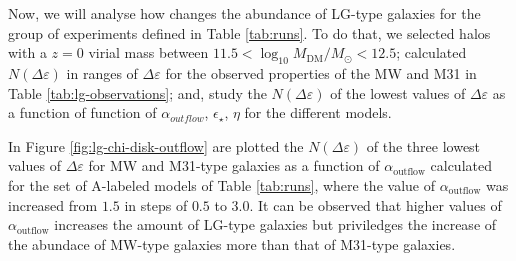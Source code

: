 \documentclass[usenatbib]{mn2e}
\begin{document}
Now, we will analyse how changes the abundance of LG-type galaxies for the group of experiments defined in Table \ref{tab:runs}. To do that, 
we selected halos with a $z=0$ virial mass between  $11.5<\log_{10} M_{\text{DM}}/M_{\odot}<12.5$; calculated $N(\Delta\varepsilon)$ in ranges 
of $\Delta\varepsilon$ for the observed properties of the MW and M31 in Table \ref{tab:lg-observations}; and, study the $N(\Delta\varepsilon)$
 of the lowest values of $\Delta\varepsilon$ as a function of function of $\alpha_{outflow}$, $\epsilon_{\star}$, $\eta$ for the different models.

In Figure \ref{fig:lg-chi-disk-outflow} are plotted the $N(\Delta\varepsilon)$ of the three lowest values of $\Delta\varepsilon$
for MW and M31-type galaxies as a function of $\alpha_{\text{outflow}}$ calculated  for the set of A-labeled models of Table  \ref{tab:runs}, where the 
value of $\alpha_{\text{outflow}}$ was increased from $1.5$ in steps of $0.5$  to $3.0$.  It can be observed that higher values of $\alpha_{\text{outflow}}$ 
increases the amount of LG-type galaxies but priviledges the increase of the abundace of MW-type galaxies more than that of M31-type galaxies. 
\end{document}
